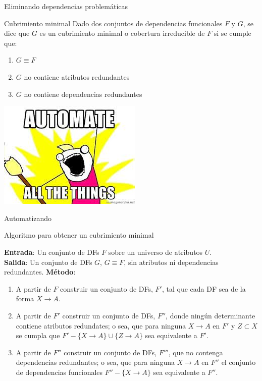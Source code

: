 \begin{frame}{Eliminando dependencias problem\'aticas}
    \begin{block}{Cubrimiento minimal}
        Dado dos conjuntos de dependencias funcionales $F$ y $G$, se dice
        que $G$ es un cubrimiento minimal o cobertura irreducible
        de $F$ si se cumple que:
        \begin{enumerate}
            \item $G \equiv F$
            \item $G$ no contiene atributos redundantes
            \item $G$ no contiene dependencias redundantes
        \end{enumerate}
        
    \end{block}
\end{frame}


{
{
    \includegraphics[width=\paperwidth,height=\paperheight]{img/automate.jpg}
}
\begin{frame}
\end{frame}
}


\begin{frame}{Automatizando}
    \begin{block}{Algoritmo para obtener un cubrimiento minimal}
        
        \textbf{Entrada}: Un conjunto de DFs $F$ sobre un universo de atributos $U$.\\
        \textbf{Salida}: Un conjunto de DFs $G$, $G \equiv F$, sin atributos ni dependencias redundantes.
        \textbf{M\'etodo}:
        \begin{enumerate}
            \item A partir de $F$ construir un conjunto de DFs, $F'$, tal que cada DF sea de la forma $X \to A$.
            \item A partir de $F'$ construir un conjunto de DFs, $F''$, donde ning\'un determinante contiene atributos redundates; o sea,
            que para ninguna $X \to A$ en $F'$ y $Z \subset X$ se cumpla que
            $F' - \{X \to A\} \cup \{Z \to A\}$ sea equivalente a $F'$.
            \item A partir de $F''$ construir un conjunto de DFs, $F'''$, que no contenga dependencias
            redundantes; o sea, que para ninguna $X \to A$ en $F''$ el conjunto de
            dependencias funcionales $F'' - \{X \to A\}$ sea equivalente a $F''$.
        \end{enumerate}
    \end{block}
\end{frame}

